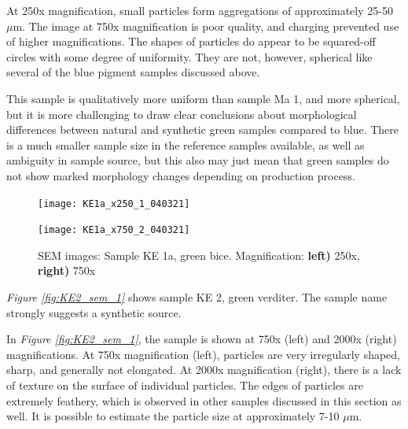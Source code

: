 At 250x magnification, small particles form aggregations of approximately 25-50 $\mu$m. The image at 750x magnification is poor quality, and charging prevented use of higher magnifications. The shapes of particles do appear to be squared-off circles with some degree of uniformity. They are not, however, spherical like several of the blue pigment samples discussed above. 

This sample is qualitatively more uniform than sample Ma 1, and more spherical, but it is more challenging to draw clear conclusions about morphological differences between natural and synthetic green samples compared to blue. There is a much smaller sample size in the reference samples available, as well as ambiguity in sample source, but this also may just mean that green samples do not show marked morphology changes depending on production process.

\begin{figure}[H]
\centering
\begin{minipage}{.45\textwidth}
  \centering
  \texttt{[image: KE1a\_x250\_1\_040321]}
\end{minipage}
\begin{minipage}{.45\textwidth}
  \centering
  \texttt{[image: KE1a\_x750\_2\_040321]}
\end{minipage}
\caption[SEM images: Sample KE 1a, green bice]{SEM images: Sample KE 1a, green bice. Magnification: \textbf{left)} 250x, \textbf{right)} 750x}
\label{fig:KE1a_sem_1}
\end{figure}




\textit{Figure \ref{fig:KE2_sem_1}} shows sample KE 2, green verditer. The sample name strongly suggests a synthetic source. 

In \textit{Figure \ref{fig:KE2_sem_1}}, the sample is shown at 750x (left) and 2000x (right) magnifications. At 750x magnification (left), particles are very irregularly shaped, sharp, and generally not elongated. At 2000x magnification (right), there is a lack of texture on the surface of individual particles. The edges of particles are extremely feathery, which is observed in other samples discussed in this section as well. It is possible to estimate the particle size at approximately 7-10 $\mu$m. 

